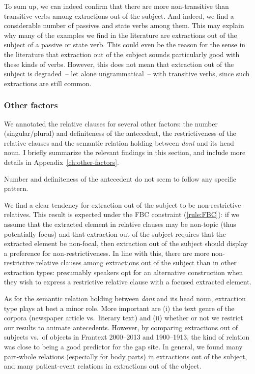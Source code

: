 To sum up, we can indeed confirm that there are more non-transitive than transitive verbs among extractions out of the subject. And indeed, we find a considerable number of passives and state verbs among them. This may explain why many of the examples we find in the literature are extractions out of the subject of a passive or state verb. This could even be the reason for the sense in the literature that extraction out of the subject sounds particularly good with these kinds of verbs. However, this does not mean that extraction out of the subject is degraded~-- let alone ungrammatical~-- with transitive verbs, since such extractions are still common.

\subsubsection{Other factors}

We annotated the relative clauses for several other factors: the number (singular/plural) and definiteness of the antecedent, the restrictiveness of the relative clauses and the semantic relation holding between \emph{dont} and its head noun. I briefly summarize the relevant findings in this section, and include more details in Appendix~\ref{ch:other-factors}.

Number and definiteness of the antecedent do not seem to follow any specific pattern.

We find a clear tendency for extraction out of the subject to be non-restrictive relatives. This result is expected under the FBC constraint (\ref{rule:FBC}): if we assume that the extracted element in relative clauses may be non-topic (thus potentially focus) and that extraction out of the subject requires that the extracted element be non-focal, then extraction out of the subject should display a preference for non-restrictiveness. In line with this, there are more non-restrictive relative clauses among extractions out of the subject than in other extraction types: presumably speakers opt for an alternative construction when they wish to express a restrictive relative clause with a focused extracted element.  

As for the semantic relation holding between \emph{dont} and its head noun, extraction type plays at best a minor role. More important are (i) the text genre of the corpora (newspaper article vs.\ literary text) and (ii) whether or not we restrict our results to animate antecedents. However, by comparing extractions out of subjects vs.\ of objects in Frantext 2000--2013 and 1900--1913, the kind of relation was close to being a good predictor for the gap site. In general, we found many part-whole relations (especially for body parts) in extractions out of the subject, and many patient-event relations in extractions out of the object.
